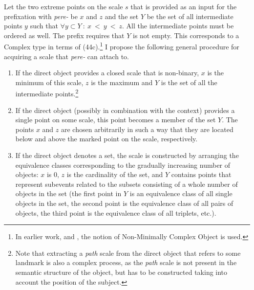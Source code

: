 Let the two extreme points on the scale $s$ that is provided as an input for the prefixation with \textit{pere-} be $x$ and $z$ and the set $Y$ be the set of all intermediate points $y$ such that $\forall y \subset Y~:~x~<~y~<~z$. All the intermediate points must be ordered as well. The prefix requires that $Y$ is not empty. This corresponds to a Complex type in terms of \citealt{Beavers:12} (44c).\footnote{In earlier work, \citealt{Beavers:02} and \citealt{Beavers:08}, the notion of Non-Minimally Complex Object is used.} I propose the following general procedure for acquiring a scale that \textit{pere-} can attach to. 
\begin{enumerate}
\item If the direct object provides a closed scale that is non-binary, $x$ is the minimum of this scale, $z$ is the maximum and $Y$ is the set of all the intermediate points.\footnote{Note that extracting a \textit{path} scale from the direct object that refers to some landmark is also a complex process, as the \textit{path} scale is not present in the semantic structure of the object, but has to be constructed taking into account the position of the subject.}
\item If the direct object (possibly in combination with the context) provides a single point on some scale, this point becomes a member of the set $Y$. The points $x$ and $z$ are chosen arbitrarily in such a way that they are located below and above the marked point on the scale, respectively. 
\item If the direct object denotes a set, the scale is constructed by arranging the equivalence classes corresponding to the gradually increasing number of objects: $x$ is 0, $z$ is the cardinality of the set, and $Y$ contains points that represent subevents related to the subsets consisting of a whole number of objects in the set (the first point in $Y$ is an equivalence class of all single objects in the set, the second point is the equivalence class of all pairs of objects, the third point is the equivalence class of all triplets, etc.).
\end{enumerate}

